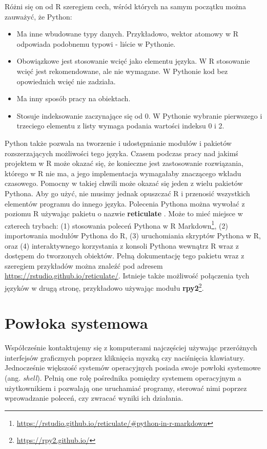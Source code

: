\documentclass[paper=6in:9in,pagesize=pdftex,headinclude=on,footinclude=on,10pt]{scrbook}
\DeclareRobustCommand{\href}[2]{#2\footnote{\url{#1}}}
\providecommand{\tightlist}{%
  \setlength{\itemsep}{0pt}\setlength{\parskip}{0pt}}
\begin{document}
Różni się on od R szeregiem cech, wśród których na samym początku można zauważyć, że Python:

\begin{itemize}
\tightlist
\item
  Ma inne wbudowane typy danych.
  Przykładowo, wektor atomowy w R odpowiada podobnemu typowi - liście w Pythonie.
\item
  Obowiązkowe jest stosowanie wcięć jako elementu języka.
  W R stosowanie wcięć jest rekomendowane, ale nie wymagane.
  W Pythonie kod bez opowiednich wcięć nie zadziała.
\item
  Ma inny sposób pracy na obiektach.
\item
  Stosuje indeksowanie zaczynające się od 0.
  W Pythonie wybranie pierwszego i trzeciego elementu z listy wymaga podania wartości indeksu 0 i 2.
\end{itemize}

Python także pozwala na tworzenie i udostępnianie modułów i pakietów rozszerzających możliwości tego języka.
Czasem podczas pracy nad jakimś projektem w R może okazać się, że konieczne jest zastosowanie rozwiązania, którego w R nie ma, a jego implementacja wymagałaby znaczącego wkładu czasowego.
Pomocny w takiej chwili może okazać się jeden z wielu pakietów Pythona.
Aby go użyć, nie musimy jednak opuszczać R i przenosić wszystkich elementów programu do innego języka.
Polecenia Pythona można wywołać z poziomu R używając pakietu o nazwie \textbf{reticulate} \citep{R-reticulate}.
Może to mieć miejsce w czterech trybach: (1) stosowania poleceń \href{https://rstudio.github.io/reticulate/\#python-in-r-markdown}{Pythona w R Markdown}, (2) importowania modułów Pythona do R, (3) uruchomiania skryptów Pythona w R, oraz (4) interaktywnego korzystania z konsoli Pythona wewnątrz R wraz z dostępem do tworzonych obiektów.
Pełną dokumentację tego pakietu wraz z szeregiem przykładów można znaleźć pod adresem \url{https://rstudio.github.io/reticulate/}.
Istnieje także możliwość połączenia tych języków w drugą stronę, przykładowo używając \href{https://rpy2.github.io/}{modułu \textbf{rpy2}}.

\hypertarget{powloka-systemowa}{%
\section{Powłoka systemowa}\label{powloka-systemowa}}

Współcześnie kontaktujemy się z komputerami najczęściej używając przeróżnych interfejsów graficznych poprzez kliknięcia myszką czy naciśnięcia klawiatury.
Jednocześnie większość systemów operacyjnych posiada swoje powłoki systemowe (ang. \emph{shell}).
Pełnią one rolę pośrednika pomiędzy systemem operacyjnym a użytkownikiem i pozwalają one uruchamiać programy, sterować nimi poprzez wprowadzanie poleceń, czy zwracać wyniki ich działania.
\end{document}
